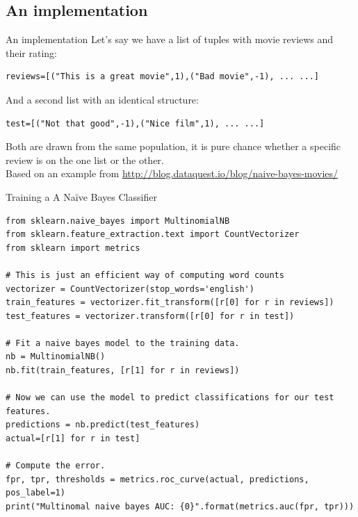 \documentclass{beamer}
\begin{document}
\subsection{An implementation}

\begin{frame}[fragile]{An implementation}
Let's say we have a list of tuples with movie reviews and their rating:
\begin{lstlisting}
reviews=[("This is a great movie",1),("Bad movie",-1), ... ...]
\end{lstlisting}
And a second list with an identical structure:
\begin{lstlisting}
test=[("Not that good",-1),("Nice film",1), ... ...]
\end{lstlisting}
Both are drawn from the same population, it is pure chance whether a specific review is on the one list or the other.\\
\tiny{Based on an example from \url{http://blog.dataquest.io/blog/naive-bayes-movies/}}
\end{frame}


\begin{frame}[fragile]{Training a A Naïve Bayes Classifier}
\begin{lstlisting}
from sklearn.naive_bayes import MultinomialNB
from sklearn.feature_extraction.text import CountVectorizer
from sklearn import metrics
 
# This is just an efficient way of computing word counts
vectorizer = CountVectorizer(stop_words='english')
train_features = vectorizer.fit_transform([r[0] for r in reviews])
test_features = vectorizer.transform([r[0] for r in test])
 
# Fit a naive bayes model to the training data.
nb = MultinomialNB()
nb.fit(train_features, [r[1] for r in reviews])
 
# Now we can use the model to predict classifications for our test features.
predictions = nb.predict(test_features)
actual=[r[1] for r in test]
 
# Compute the error.
fpr, tpr, thresholds = metrics.roc_curve(actual, predictions, pos_label=1)
print("Multinomal naive bayes AUC: {0}".format(metrics.auc(fpr, tpr)))

\end{lstlisting}
\end{frame}
%
\end{document}
